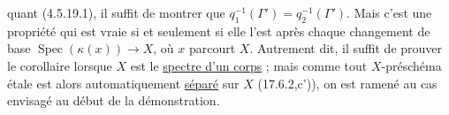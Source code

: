 
quant (4.5.19.1), il suffit de montrer que $q_1^{-1}(\Gamma')=q_2^{-1}(\Gamma')$. Mais c'est une propriété  qui est vraie si  et seulement si elle l'est après chaque changement de base $\operatorname{Spec}(\kappa(x))\to X$, où $x$ parcourt $X$. Autrement dit, il suffit de prouver le corollaire lorsque $X$ est le \uline{spectre d'un corps} ; mais comme tout $X$-préschéma étale est alors automatiquement \uline{séparé} sur $X$ (17.6.2,c')), on est ramené au cas envisagé au début de la démonstration.


